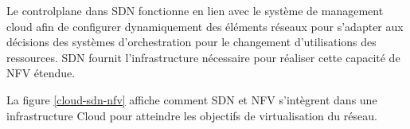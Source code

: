 


Le \gls{controlplane} dans SDN fonctionne en lien avec le système de management cloud afin de configurer dynamiquement des éléments réseaux pour s'adapter aux décisions des systèmes d'orchestration pour le changement d'utilisations des ressources. SDN fournit l'infrastructure nécessaire pour réaliser cette capacité de NFV étendue.

La figure \ref{cloud-sdn-nfv} affiche comment SDN et NFV s'intègrent dans une infrastructure Cloud pour atteindre les objectifs de virtualisation du réseau. \\

